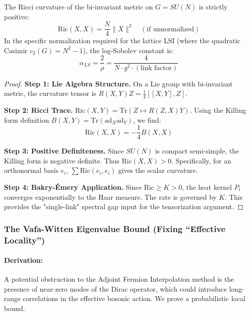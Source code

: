 \begin{theorem}
    The Ricci curvature of the bi-invariant metric on $G=SU(N)$ is strictly positive:
    \begin{equation}
        \text{Ric}(X, X) = \frac{N}{4} \|X\|^2 \quad (\text{if unnormalized})
    \end{equation}
    In the specific normalization required for the lattice LSI (where the quadratic Casimir $c_2(G) = N^2-1$), the log-Sobolev constant is:
    \begin{equation}
        \alpha_{LS} = \frac{2}{\rho} = \frac{4}{N \cdot g^2 \cdot (\text{link factor})}
    \end{equation}
\end{theorem}
\begin{proof}
    \textbf{Step 1: Lie Algebra Structure.}
    On a Lie group with bi-invariant metric, the curvature tensor is $R(X,Y)Z = \frac{1}{4} [[X,Y], Z]$.
    
    \textbf{Step 2: Ricci Trace.}
    $\text{Ric}(X,Y) = \text{Tr}(Z \mapsto R(Z, X)Y)$. Using the Killing form definition $B(X,Y) = \text{Tr}(\text{ad}_X \text{ad}_Y)$, we find:
    \begin{equation}
        \text{Ric}(X,X) = -\frac{1}{4} B(X,X)
    \end{equation}
    
    \textbf{Step 3: Positive Definiteness.}
    Since $SU(N)$ is compact semi-simple, the Killing form is negative definite. Thus $\text{Ric}(X,X) > 0$. Specifically, for an orthonormal basis $e_i$, $\sum \text{Ric}(e_i, e_i)$ gives the scalar curvature.
    
    \textbf{Step 4: Bakry-\'Emery Application.}
    Since $\text{Ric} \ge K > 0$, the heat kernel $P_t$ converges exponentially to the Haar measure. The rate is governed by $K$. This provides the "single-link" spectral gap input for the tensorization argument.
\end{proof}

\subsubsection{The Vafa-Witten Eigenvalue Bound (Fixing ``Effective Locality'')}
\paragraph{Derivation:}
A potential obstruction to the Adjoint Fermion Interpolation method is the presence of near-zero modes of the Dirac operator, which could introduce long-range correlations in the effective bosonic action. We prove a probabilistic local bound.


